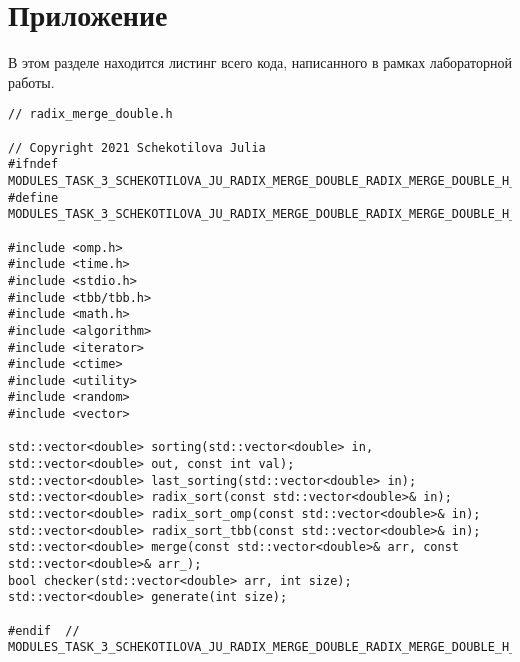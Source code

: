 \documentclass{report}
\begin{document}
\section*{Приложение}
В этом разделе находится листинг всего кода, написанного в рамках лабораторной работы.
\begin{lstlisting}
// radix_merge_double.h

// Copyright 2021 Schekotilova Julia
#ifndef MODULES_TASK_3_SCHEKOTILOVA_JU_RADIX_MERGE_DOUBLE_RADIX_MERGE_DOUBLE_H_
#define MODULES_TASK_3_SCHEKOTILOVA_JU_RADIX_MERGE_DOUBLE_RADIX_MERGE_DOUBLE_H_

#include <omp.h>
#include <time.h>
#include <stdio.h>
#include <tbb/tbb.h>
#include <math.h>
#include <algorithm>
#include <iterator>
#include <ctime>
#include <utility>
#include <random>
#include <vector>

std::vector<double> sorting(std::vector<double> in, std::vector<double> out, const int val);
std::vector<double> last_sorting(std::vector<double> in);
std::vector<double> radix_sort(const std::vector<double>& in);
std::vector<double> radix_sort_omp(const std::vector<double>& in);
std::vector<double> radix_sort_tbb(const std::vector<double>& in);
std::vector<double> merge(const std::vector<double>& arr, const std::vector<double>& arr_);
bool checker(std::vector<double> arr, int size);
std::vector<double> generate(int size);

#endif  // MODULES_TASK_3_SCHEKOTILOVA_JU_RADIX_MERGE_DOUBLE_RADIX_MERGE_DOUBLE_H_

\end{lstlisting}
\end{document}
